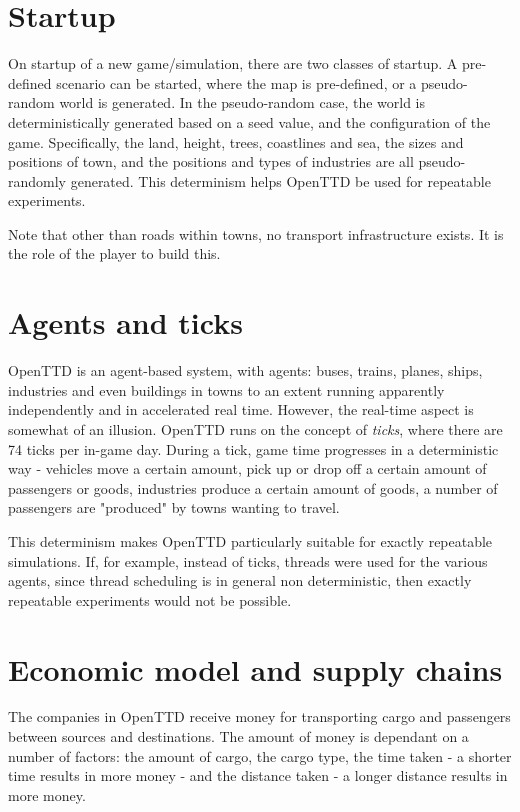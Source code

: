 \documentclass[logo,msc,dsti]{infthesis}    %
\begin{document}
\section{Startup}

On startup of a new game/simulation, there are two classes of startup. A pre-defined scenario can be started, where the map is pre-defined, or a pseudo-random world is generated. In the pseudo-random case, the world is deterministically generated based on a seed value, and the configuration of the game. Specifically, the land, height, trees, coastlines and sea, the sizes and positions of town, and the positions and types of industries are all pseudo-randomly generated. This determinism helps OpenTTD be used for repeatable experiments.

Note that other than roads within towns, no transport infrastructure exists. It is the role of the player to build this.

\section{Agents and ticks}

OpenTTD is an agent-based system, with agents: buses, trains, planes, ships, industries and even buildings in towns to an extent running apparently independently and in accelerated real time. However, the real-time aspect is somewhat of an illusion. OpenTTD runs on the concept of \emph{ticks}, where there are 74 ticks per in-game day. During a tick, game time progresses in a deterministic way - vehicles move a certain amount, pick up or drop off a certain amount of passengers or goods, industries produce a certain amount of goods, a number of passengers are "produced" by towns wanting to travel.

This determinism makes OpenTTD particularly suitable for exactly repeatable simulations. If, for example, instead of ticks, threads were used for the various agents, since thread scheduling is in general non deterministic, then exactly repeatable experiments would not be possible.

\section{Economic model and supply chains}

The companies in OpenTTD receive money for transporting cargo and passengers between sources and destinations. The amount of money is dependant on a number of factors: the amount of cargo, the cargo type, the time taken - a shorter time results in more money - and the distance taken - a longer distance results in more money.
\end{document}
